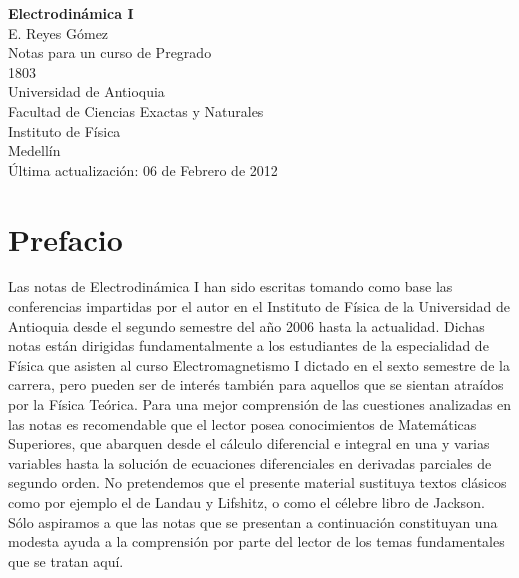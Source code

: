 \documentclass[12pt,a4paper]{book}
\begin{document}
\begin{titlepage}
\begin{center}
\vspace*{3cm}
{\huge \textbf{Electrodinámica I}}\\[2cm]

{\Large E. Reyes Gómez}\\[6cm]

{\large Notas para un curso de Pregrado}\\[5cm]

{\small 1803}\\[1cm]

{\small Universidad de Antioquia\\
Facultad de Ciencias Exactas y Naturales\\
Instituto de Física\\
Medellín}\\[1cm]

{\small Última actualización: 06 de Febrero de 2012}
\end{center}
\end{titlepage}

\chapter*{Prefacio}

Las notas de Electrodinámica I han sido escritas tomando como base las conferencias impartidas por el autor en el Instituto de Física de la Universidad de Antioquia desde el segundo semestre del año 2006 hasta la actualidad. Dichas notas están dirigidas fundamentalmente a los estudiantes de la especialidad de Física que asisten al curso Electromagnetismo I dictado en el sexto semestre de la carrera, pero pueden ser de interés también para aquellos que se sientan atraídos por la Física Teórica. Para una mejor comprensión de las cuestiones analizadas en las notas es recomendable que el lector posea conocimientos de Matemáticas Superiores, que abarquen desde el cálculo diferencial e integral en una y varias variables hasta la solución de ecuaciones diferenciales en derivadas parciales de segundo orden. No pretendemos que el presente material sustituya textos clásicos como por ejemplo el de Landau y Lifshitz, o como el célebre libro de Jackson. Sólo aspiramos a que las notas que se presentan a continuación constituyan una modesta ayuda a la comprensión por parte del lector de los temas fundamentales que se tratan aquí.
\end{document}
